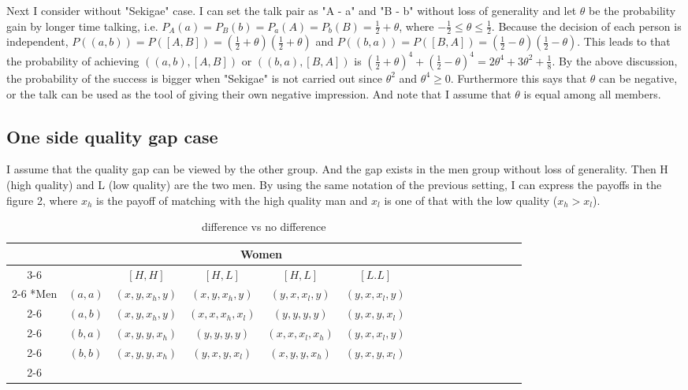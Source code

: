 \documentclass{article}
\begin{document}
	\par
	Next I consider without "Sekigae" case. I can set the talk pair as "A - a" and "B - b" without loss of generality and let $\theta$ be the probability gain by longer time talking, i.e. $P_A(a)= P_B(b) = P_a(A) = P_b(B) = \frac{1}{2} + \theta$, where $-\frac{1}{2} \leq\theta \leq \frac{1}{2}$. Because the decision of each person is independent, $P((a,b)) = P([A, B]) = \left( \frac{1}{2} + \theta \right) \left( \frac{1}{2} + \theta\right)$ and $P((b, a)) = P([B, A]) =  \left( \frac{1}{2} - \theta \right) \left( \frac{1}{2} - \theta\right)$. This leads to that the probability of achieving $\left( (a, b), [A, B] \right)$ or $\left( (b, a), [B, A] \right)$ is $ \left( \frac{1}{2} + \theta \right)^4 + \left( \frac{1}{2} - \theta\right)^4 = 2\theta^4 + 3\theta^2 + \frac{1}{8}$.
	By the above discussion, the probability of the success is bigger when "Sekigae" is not carried out since $\theta^2$ and $\theta^4 \geq 0$. Furthermore this says that $\theta$ can be negative, or the talk can be used as the tool of giving their own negative impression. And note that I assume that $\theta$ is equal among all members.

	\subsection{One side quality gap case}
	I assume that the quality gap can be viewed by the other group. And the gap exists in the men group without loss of generality. Then H (high quality) and L (low quality) are the two men. By using the same notation of the previous setting, I can express the payoffs in the figure 2, where $x_h$ is the payoff of matching with the high quality man and $x_l$ is one of that with the low quality ($x_h > x_l$).
	
	\begin{table}[h]
		\begin{center}
                \setlength{\extrarowheight}{2pt}
                \begin{tabular}{*{16}{c|}}
                  \multicolumn{2}{c}{} & \multicolumn{1}{c}{} & \multicolumn{2}{c}{Women}\\\cline{3-6}
                  \multicolumn{1}{c}{} &  & $[H, H]$  & $[H, L]$ & $[H, L]$ & $[L.L]$\\\cline{2-6}
                  \multirow{4}*{Men}  & $(a,a)$ & $(x,y,x_h,y)$ & $(x,y,x_h,y)$ & $(y,x,x_l,y)$ & $(y,x,x_l,y)$\\\cline{2-6}
                  & $(a,b)$ & $(x,y,x_h,y)$ & $(x,x,x_h,x_l)$ & $(y,y,y,y)$ & $(y,x,y,x_l)$\\\cline{2-6}
                  & $(b,a)$ & $(x,y,y,x_h)$ & $(y,y,y,y)$ & $(x,x,x_l,x_h)$ & $(y,x,x_l,y)$\\\cline{2-6}
                  & $(b,b)$ & $(x,y,y,x_h)$ & $(y,x,y,x_l)$ & $(x,y,y,x_h)$ & $(y,x,y,x_l)$\\\cline{2-6}
                \end{tabular}
                \end{center}
                \caption{difference vs no difference}
          \end{table}
          
\end{document}
